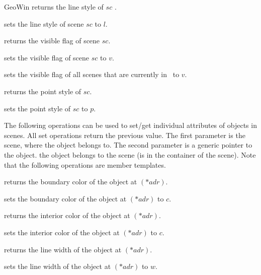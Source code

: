 \begin{ccRefClass}{GeoWin}
{returns the line style of $sc$ .}
  
{sets the line style of scene $sc$ to $l$.}

{returns the visible flag of scene $sc$. }
  
{sets the visible flag of scene $sc$ to $v$. }

{sets the visible flag of all scenes that are currently in \ccVar\ to $v$.}
  
{returns the point style of $sc$.}
  
{sets the point style of $sc$ to $p$.}

\begin{ccAdvanced}

\medskip
{The following operations can be used to set/get 
individual attributes of objects in scenes.
All set operations return the previous value.
The first parameter is the scene, where the object belongs to.
The second parameter is a generic pointer to the object.
\ccPrecond the object belongs to the scene (is in the container
of the scene).
Note that the following operations are member templates. 
}

{returns the boundary color of the object at $(*adr)$.}

{sets the boundary color of the object at $(*adr)$ to $c$.}  

{returns the interior color of the object at $(*adr)$.}

{sets the interior color of the object at $(*adr)$ to $c$.}   

\clearpage
{}
{returns the line width of the object at $(*adr)$.} 

{sets the line width of the object at $(*adr)$ to $w$.}


\end{ccAdvanced}
\end{ccRefClass}
